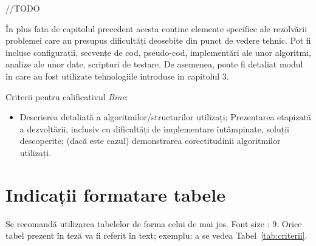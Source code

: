 \documentclass[12pt,a4paper]{report}
\numberwithin{equation}{section} %
\begin{document}
//TODO

În plus fata de capitolul precedent acesta conține elemente specifice ale rezolvării problemei care au presupus dificultăți deosebite din punct de vedere tehnic. Pot fi incluse configurații, secvențe de cod, pseudo-cod, implementări ale unor algoritmi, analize ale unor date, scripturi de testare. De asemenea, poate fi detaliat modul în care au fost utilizate tehnologiile introduse in capitolul 3.


Criterii pentru calificativul \textit{Bine}:
\begin{itemize}
	\item	Descrierea detaliată a algoritmilor/structurilor utilizați; Prezentarea etapizată a dezvoltării, inclusiv cu dificultăți de implementare întâmpinate, soluții descoperite; (dacă este cazul) demonstrarea corectitudinii algoritmilor utilizați.
\end{itemize}

\section{Indicații formatare tabele}
Se recomandă utilizarea tabelelor de forma celui de mai jos.  Font size :  9.
Orice tabel prezent în teză va fi referit în text; exemplu: a se vedea Tabel~\ref{tab:criterii}.
\end{document}
